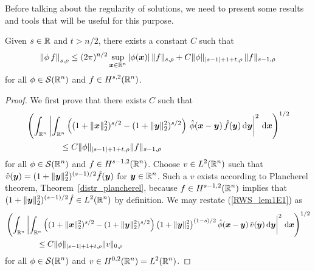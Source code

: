 Before talking about the regularity of solutions, we need to present
some results and tools that will be useful for this purpose.

\begin{lemma} \label{ell_reg_lemma1}
Given $s\in \mathbb{R}$ and $t>n/2$, there exists a constant $C$ such that
\[
  \left\| \phi \, f \right\|_{s,\rho} \leq
(2\pi)^{n/2} \sup_{{\bm{x}} \in \mathbb{R}^n} |\phi({\bm{x}})|\, \|f\|_{s,\rho}
+ C \|\phi\|_{|s-1|+1+t,\rho} \, \|f \|_{s-1,\rho}
\]
for all $\displaystyle \phi \in \mathcal{S}(\mathbb{R}^n)$ and
$\displaystyle f \in H^{s,2}(\mathbb{R}^n)$.
\end{lemma}

\begin{proof}
 We first prove that there exists $C$ such that
\begin{equation} \label{RWS_lem1E1}
\begin{split}
&\left( \int_{\mathbb{R}^n} \left|
\int_{\mathbb{R}^n} \left( (1+\|{\bm{x}}\|_2^2)^{s/2} - (1+\|{\bm{y}}\|_2^2)^{s/2}\right)
\, \hat{\phi}({\bm{x}}-{\bm{y}}) \,
\hat{f}({\bm{y}}) \,\mathrm{d}{{\bm{y}}} \right|^2 \,\mathrm{d}{{\bm{x}}} \right)^{1/2}\\
&\qquad \qquad \leq C \|\phi\|_{|s-1|+1+t,\rho}\|f \|_{s-1,\rho}
\end{split}
\end{equation}
for all $\displaystyle \phi \in \mathcal{S}(\mathbb{R}^n)$ and
$\displaystyle f \in H^{s-1,2}(\mathbb{R}^n)$.
Choose $\displaystyle v \in L^2(\mathbb{R}^n)$ such that
$\displaystyle \hat{v}({\bm{y}}) = (1+\|{\bm{y}}\|_2^2)^{(s-1)/2} \hat{f}({\bm{y}})$
for $\displaystyle {\bm{y}} \in \mathbb{R}^n$.  Such a $v$ exists
according to Plancherel theorem, Theorem~\ref{distr_plancherel},
because $\displaystyle f \in H^{s-1,2}(\mathbb{R}^n)$ implies that
$\displaystyle (1 + \|{\bm{y}}\|_2^2)^{(s-1)/2} \hat{f} \in L^2(\mathbb{R}^n)$
by definition.  We may restate (\ref{RWS_lem1E1}) as
\begin{align}
&\left( \int_{\mathbb{R}^n} \left|
\int_{\mathbb{R}^n} \left( (1+\|{\bm{x}}\|_2^2)^{s/2} - (1+\|{\bm{y}}\|_2^2)^{s/2}\right)
\left( 1 + \|{\bm{y}}\|_2^2\right)^{(1-s)/2} \hat{\phi}({\bm{x}}-{\bm{y}}) \,
\hat{v}({\bm{y}}) \,\mathrm{d}{{\bm{y}}} \right|^2 \,\mathrm{d}{{\bm{x}}} \right)^{1/2} \nonumber
\\
&\qquad \qquad \leq C \|\phi\|_{|s-1|+1+t,\rho}\|v \|_{0,\rho}
\label{RWS_lem1E2}
\end{align}
for all $\displaystyle \phi \in \mathcal{S}(\mathbb{R}^n)$ and
$\displaystyle v \in H^{0,2}(\mathbb{R}^n) = L^2(\mathbb{R}^n)$.


\end{proof}
